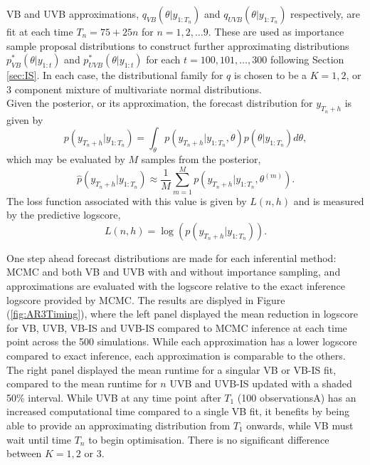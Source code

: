 \documentclass[12pt,a4paper]{article}\usepackage[]{graphicx}\usepackage[]{color}
\begin{document}
VB and UVB approximations, $q_{VB}(\theta | y_{1:T_n})$ and $q_{UVB}(\theta | y_{1:T_n})$ respectively, are fit at each time $T_n = 75 + 25n$ for $n = 1, 2, \dots 9$. These are used as importance sample proposal distributions to construct further approximating distributions $p^*_{VB}(\theta | y_{1:t})$ and $p^*_{UVB}(\theta | y_{1:t})$ for each $t = 100, 101, \dots, 300$ following Section \ref{sec:IS}. In each case, the distributional family for $q$ is chosen to be a $K = 1, 2$, or $3$ component mixture of multivariate normal distributions.
\\

Given the posterior, or its approximation, the forecast distribution for $y_{T_n+h}$ is given by
\begin{equation}
\label{forecastDist}
p(y_{T_n + h} | y_{1:T_n}) = \int_{\theta} p(y_{T_n + h} | y_{1:T_n}, \theta)p(\theta | y_{1:T_n})d\theta,
\end{equation}
which may be evaluated by $M$ samples from the posterior,
\begin{equation}
\label{forecastDistApprox}
\hat{p}(y_{T_n + h} | y_{1:T_n}) \approx \frac{1}{M} \sum_{m=1}^M  p(y_{T_n + h} | y_{1:T_n}, \theta^{(m)}).
\end{equation}
The loss function associated with this value is given by $L(n, h)$ and is measured by the predictive logscore,
\begin{equation}
\label{loss:logscore}
L(n, h) = \log(p(y_{T_n + h} | y_{1:T_n})).
\end{equation}

One step ahead forecast distributions are made for each inferential method: MCMC and both VB and UVB with and without importance sampling, and approximations are evaluated with the logscore relative to the exact inference logscore provided by MCMC. The results are displyed in Figure (\ref{fig:AR3Timing}), where the left panel displayed the mean reduction in logscore for VB, UVB, VB-IS and UVB-IS compared to MCMC inference at each time point across the 500 simulations. While each approximation has a lower logscore compared to exact inference, each approximation is comparable to the others.
\\

The right panel displayed the mean runtime for a singular VB or VB-IS fit, compared to the mean runtime for $n$ UVB and UVB-IS updated with a shaded 50\% interval. While UVB at any time point after $T_1$ (100 observationsA) has an increased computational time compared to a single VB fit, it benefits by being able to provide an approximating distribution from $T_1$ onwards, while VB must wait until time $T_n$ to begin optimisation. There is no significant difference between $K = 1, 2 $ or $3$.   
\end{document}

